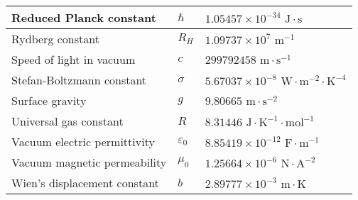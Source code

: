 \documentclass[../main.tex]{subfiles}
\begin{document}
\begin{center}
\begin{tabular}{|l|l|l|}
        \hline
        Reduced Planck constant                  & $\hbar$                               & $1.05457\times 10^{-34}\text{ J}\cdot\text{s}$                           \\
        \hline
        Rydberg constant                         & $R_H$                                 & $1.09737\times 10^7\text{ m}^{-1}$                                       \\
        \hline
        Speed of light in vacuum                 & $c$                                   & $299792458\text{ m}\cdot\text{s}^{-1}$                                   \\
        \hline
        Stefan-Boltzmann constant                & $\sigma$                              & $5.67037\times 10^{-8}\text{ W}\cdot\text{m}^{-2}\cdot\text{K}^{-4}$     \\
        \hline
        Surface gravity                          & $g$                                   & $9.80665\text{ m}\cdot\text{s}^{-2}$                                     \\
        \hline
        Universal gas constant                   & $R$                                   & $8.31446\text{ J}\cdot\text{K}^{-1}\cdot\text{mol}^{-1}$                 \\
        \hline
        Vacuum electric permittivity             & $\varepsilon_0$                       & $8.85419\times 10^{-12}\text{ F}\cdot\text{m}^{-1}$                      \\
        \hline
        Vacuum magnetic permeability             & $\mu_0$                               & $1.25664\times 10^{-6}\text{ N}\cdot\text{A}^{-2}$                       \\
        \hline
        Wien's displacement constant             & $b$                                   & $2.89777\times 10^{-3}\text{ m}\cdot\text{K}$                            \\
        \hline
    \end{tabular}
\end{center}
\end{document}
